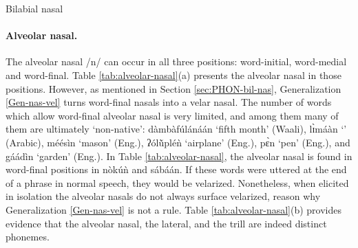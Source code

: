 \begin{table}[htb] \small
\centering
\caption{Bilabial nasal\label{tab:bilabial-nasal}}

\quad
{}
\end{table}


\paragraph{Alveolar nasal.}

The alveolar nasal  /{\sls n}/ can occur in all three positions: word-initial, 
word-medial and word-final. Table \ref{tab:alveolar-nasal}(a) presents the 
alveolar nasal in those positions.  However,  as mentioned in Section 
\ref{sec:PHON-bil-nas},  Generalization \ref{Gen-nas-vel} turns 
word-final 
nasals into a 
velar nasal. The number of words which allow word-final alveolar nasal is very 
limited, and among them many of them are ultimately `non-native': {\sls 
dàmbàfúlánáán} `fifth month' (Waali),  {\sls lɪ̀máàn} `' (Arabic),  {\sls 
méésìn} 
`mason' (Eng.),  {\sls ʔólŭ̀pléǹ} `airplane' (Eng.),  {\sls pɛ̀n} `pen'  
(Eng.), 
and  {\sls gáádìn} `garden'  (Eng.). In Table \ref{tab:alveolar-nasal}, the 
alveolar nasal is found in word-final positions in  {\sls nòkúǹ} and {\sls  
sábáán}. If these words were  uttered at the end of a phrase in normal 
speech, they would be  velarized. Nonetheless, when elicited in isolation the 
alveolar nasals  do not always surface velarized, reason why Generalization 
\ref{Gen-nas-vel} is not a rule. Table \ref{tab:alveolar-nasal}(b) 
provides 
evidence that the alveolar nasal, the lateral, and the trill  are indeed 
distinct phonemes.


